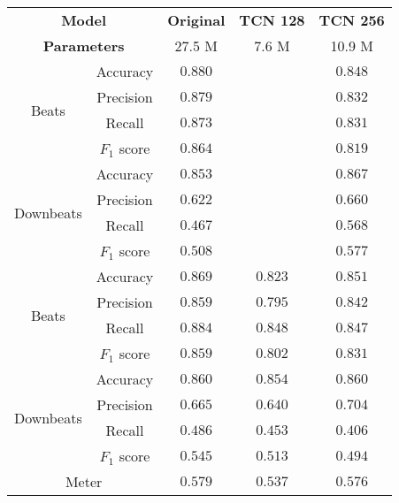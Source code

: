 \begin{tabular}{cc|ccc}
    \multicolumn{2}{c|}{\textbf{Model}} & \textbf{Original} & \textbf{TCN 128} & \textbf{TCN 256} \\
    \multicolumn{2}{c|}{\textbf{Parameters}} & 27.5 M & 7.6 M & 10.9 M \\\hline
    \multirow{4}{*}{Beats}     & Accuracy    & $\mathbf{0.880}$ & $ $ & $0.848$          \\
    & Precision   & $\mathbf{0.879}$ & $ $ & $0.832$          \\
    & Recall      & $\mathbf{0.873}$ & $ $ & $0.831$          \\
    & $F_1$ score & $\mathbf{0.864}$ & $ $ & $0.819$          \\\hline
    \multirow{4}{*}{Downbeats} & Accuracy    & $\mathbf{0.853}$ & $ $ & $\mathbf{0.867}$ \\
    & Precision   & $0.622$          & $ $ & $0.660$ \\
    & Recall      & $\mathbf{0.467}$ & $ $ & $0.568$          \\
    & $F_1$ score & $\mathbf{0.508}$ & $ $ & $0.577$          \\\hline
    \multirow{4}{*}{Beats}     & Accuracy    & $\mathbf{0.869}$ & $0.823$ & $0.851$          \\
    & Precision   & $\mathbf{0.859}$ & $0.795$ & $0.842$          \\
    & Recall      & $\mathbf{0.884}$ & $0.848$ & $0.847$          \\
    & $F_1$ score & $\mathbf{0.859}$ & $0.802$ & $0.831$          \\\hline
    \multirow{4}{*}{Downbeats} & Accuracy    & $\mathbf{0.860}$ & $0.854$ & $\mathbf{0.860}$ \\
    & Precision   & $0.665$          & $0.640$ & $\mathbf{0.704}$ \\
    & Recall      & $\mathbf{0.486}$ & $0.453$ & $0.406$          \\
    & $F_1$ score & $\mathbf{0.545}$ & $0.513$ & $0.494$          \\\hline
    \multicolumn{2}{c|}{Meter} & $\mathbf{0.579}$ & $0.537$ & $0.576$ \\
\end{tabular}
